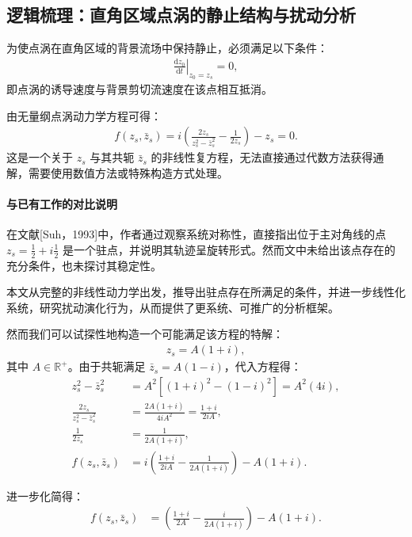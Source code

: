 
\subsection{逻辑梳理：直角区域点涡的静止结构与扰动分析}

为使点涡在直角区域的背景流场中保持静止，必须满足以下条件：
\begin{align}
    \left.\frac{\mathrm{d}z_{0}}{\mathrm{d}t}\right|_{z_{0}=z_{s}} = 0,
\end{align}
即点涡的诱导速度与背景剪切流速度在该点相互抵消。

由无量纲点涡动力学方程可得：
\begin{align}
    f(z_s, \bar{z}_s) = i\left( \frac{2z_s}{z_s^2 - \bar{z}_s^2} - \frac{1}{2z_s} \right) - z_s = 0.
\end{align}
这是一个关于 $z_s$ 与其共轭 $\bar{z}_s$ 的非线性复方程，无法直接通过代数方法获得通解，需要使用数值方法或特殊构造方式处理。

\paragraph{与已有工作的对比说明}
在文献[Suh，1993]中，作者通过观察系统对称性，直接指出位于主对角线的点 $z_s = \frac{1}{2} + i\frac{1}{2}$ 是一个驻点，并说明其轨迹呈旋转形式。然而文中未给出该点存在的充分条件，也未探讨其稳定性。

本文从完整的非线性动力学出发，推导出驻点存在所满足的条件，并进一步线性化系统，研究扰动演化行为，从而提供了更系统、可推广的分析框架。


然而我们可以试探性地构造一个可能满足该方程的特解：
\begin{align}
    z_s = A(1+i),
\end{align}
其中 $A \in \mathbb{R}^{+}$。由于共轭满足 $\bar{z}_s = A(1 - i)$，代入方程得：
\begin{align*}
    z_s^2 - \bar{z}_s^2 &= A^2\left[(1+i)^2 - (1-i)^2\right] = A^2(4i), \\
    \frac{2z_s}{z_s^2 - \bar{z}_s^2} &= \frac{2A(1+i)}{4i A^2} = \frac{1+i}{2i A}, \\
    \frac{1}{2z_s} &= \frac{1}{2A(1+i)}, \\
    f(z_s, \bar{z}_s) &= i\left( \frac{1+i}{2i A} - \frac{1}{2A(1+i)} \right) - A(1+i).
\end{align*}

进一步化简得：
\begin{align*}
    f(z_s, \bar{z}_s) &= \left( \frac{1+i}{2A} - \frac{i}{2A(1+i)} \right) - A(1+i).
\end{align*}

